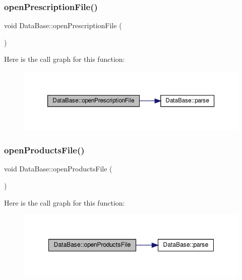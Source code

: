 \subsubsection{\texorpdfstring{open\+Prescription\+File()}{openPrescriptionFile()}}
{\footnotesize\ttfamily void Data\+Base\+::open\+Prescription\+File (\begin{DoxyParamCaption}{ }\end{DoxyParamCaption})}

Here is the call graph for this function\+:\nopagebreak
\begin{figure}[H]
\begin{center}
\leavevmode
\includegraphics[width=350pt]{classDataBase_a10c16844e17eae108e828390a92fb3b8_cgraph}
\end{center}
\end{figure}
\mbox{\label{classDataBase_abcf98b385e2a76f71b602e791699dbb3}} 
\subsubsection{\texorpdfstring{open\+Products\+File()}{openProductsFile()}}
{\footnotesize\ttfamily void Data\+Base\+::open\+Products\+File (\begin{DoxyParamCaption}{ }\end{DoxyParamCaption})}

Here is the call graph for this function\+:\nopagebreak
\begin{figure}[H]
\begin{center}
\leavevmode
\includegraphics[width=348pt]{classDataBase_abcf98b385e2a76f71b602e791699dbb3_cgraph}
\end{center}
\end{figure}
\mbox{\label{classDataBase_a5b7842d4ca431e2edb592fadc16da4c6}} 
